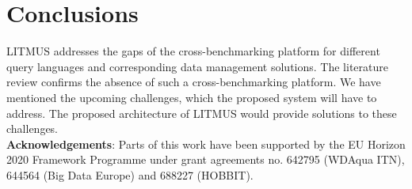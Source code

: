 \documentclass{llncs}
\begin{document}
\section{Conclusions}\label{conclusion} 
LITMUS addresses the gaps of the cross-benchmarking platform for different query languages and corresponding data management solutions. 
The literature review confirms the absence of such a cross-benchmarking platform.
We have mentioned the upcoming challenges, which the proposed system will have to address.
The proposed architecture of LITMUS would provide solutions to these challenges. \\
\textbf{Acknowledgements}: Parts of this work have been supported by the EU Horizon 2020 Framework Programme under grant agreements no. 642795 (WDAqua ITN), 644564 (Big Data Europe) and 688227 (HOBBIT).



\end{document}
